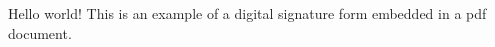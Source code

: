 \documentclass{article}
\begin{document}
Hello world!
This is an example of a digital signature form embedded in a pdf document.

\end{document}
